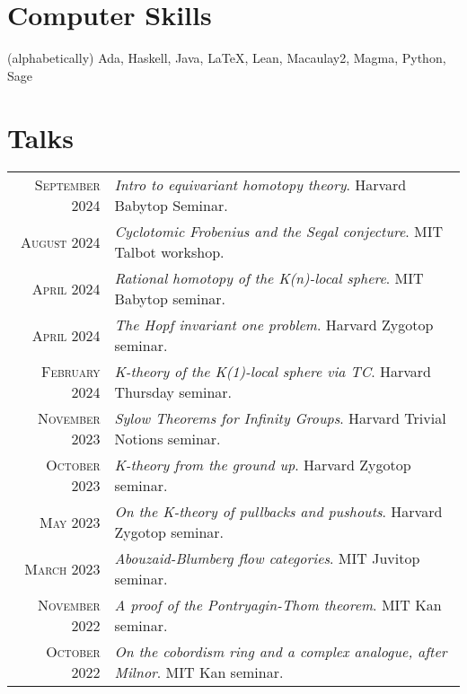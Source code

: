 \documentclass[a4paper,11pt]{article} %
\begin{document}
\section{Computer Skills}

(alphabetically) Ada, Haskell, Java, {\fb \LaTeX}, Lean, Macaulay2, Magma, Python, Sage


\section{Talks}

\begin{tabular}{rl}

\textsc{September} 2024 & \emph{Intro to equivariant homotopy theory}. Harvard Babytop Seminar.\\

\textsc{August} 2024 & \emph{Cyclotomic Frobenius and the Segal conjecture}. MIT Talbot workshop.\\

\textsc{April} 2024 & \emph{Rational homotopy of the K(n)-local sphere}. MIT Babytop seminar.\\

\textsc{April} 2024 & \emph{The Hopf invariant one problem}. Harvard Zygotop seminar.\\

\textsc{February} 2024 & \emph{K-theory of the K(1)-local sphere via TC}. Harvard Thursday seminar.\\

\textsc{November} 2023 & \emph{Sylow Theorems for Infinity Groups}. Harvard Trivial Notions seminar.\\

\textsc{October} 2023 & \emph{K-theory from the ground up}. Harvard Zygotop seminar.\\

\textsc{May} 2023 & \emph{On the K-theory of pullbacks and pushouts}. Harvard Zygotop seminar.\\

\textsc{March} 2023 & \emph{Abouzaid-Blumberg flow categories}. MIT Juvitop seminar.\\

\textsc{November} 2022 & \emph{A proof of the Pontryagin-Thom theorem}. MIT Kan seminar.\\

\textsc{October} 2022 & \emph{On the cobordism ring and a complex analogue, after Milnor}. MIT Kan seminar.

\end{tabular}
\end{document}

